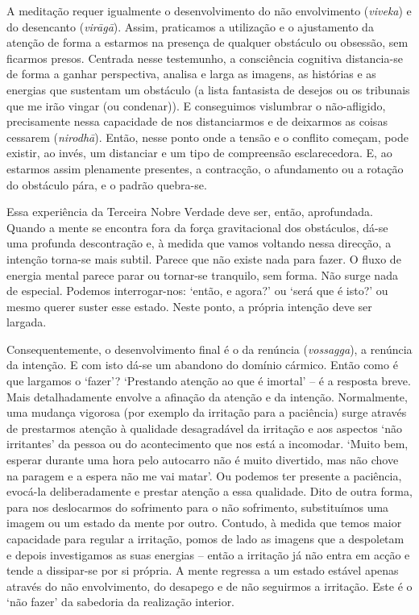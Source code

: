 A meditação requer igualmente o desenvolvimento do não envolvimento (\emph{viveka}) e do desencanto (\emph{virāgā}). Assim, praticamos a utilização e o ajustamento da atenção de forma a estarmos na presença de qualquer obstáculo ou obsessão, sem ficarmos presos. Centrada nesse testemunho, a consciência cognitiva distancia-se de forma a ganhar perspectiva, analisa e larga as imagens, as histórias e as energias que sustentam um obstáculo (a lista fantasista de desejos ou os tribunais que me irão vingar (ou condenar)). E conseguimos vislumbrar o não-afligido, precisamente nessa capacidade de nos distanciarmos e de deixarmos as coisas cessarem (\emph{nirodhā}). Então, nesse ponto onde a tensão e o conflito começam, pode existir, ao invés, um distanciar e um tipo de compreensão esclarecedora. E, ao estarmos assim plenamente presentes, a contracção, o afundamento ou a rotação do obstáculo pára, e o padrão quebra-se.

Essa experiência da Terceira Nobre Verdade deve ser, então, aprofundada. Quando a mente se encontra fora da força gravitacional dos obstáculos, dá-se uma profunda descontração e, à medida que vamos voltando nessa direcção, a intenção torna-se mais subtil. Parece que não existe nada para fazer. O fluxo de energia mental parece parar ou tornar-se tranquilo, sem forma. Não surge nada de especial. Podemos interrogar-nos: `então, e agora?' ou `será que é isto?' ou mesmo querer suster esse estado. Neste ponto, a própria intenção deve ser largada.

Consequentemente, o desenvolvimento final é o da renúncia (\emph{vossagga}), a renúncia da intenção. E com isto dá-se um abandono do domínio cármico. Então como é que largamos o `fazer'? `Prestando atenção ao que é imortal' -- é a resposta breve. Mais detalhadamente envolve a afinação da atenção e da intenção. Normalmente, uma mudança vigorosa (por exemplo da irritação para a paciência) surge através de prestarmos atenção à qualidade desagradável da irritação e aos aspectos `não irritantes' da pessoa ou do acontecimento que nos está a incomodar. `Muito bem, esperar durante uma hora pelo autocarro não é muito divertido, mas não chove na paragem e a espera não me vai matar'. Ou podemos ter presente a paciência, evocá-la deliberadamente e prestar atenção a essa qualidade. Dito de outra forma, para nos deslocarmos do sofrimento para o não sofrimento, substituímos uma imagem ou um estado da mente por outro. Contudo, à medida que temos maior capacidade para regular a irritação, pomos de lado as imagens que a despoletam e depois investigamos as suas energias -- então a irritação já não entra em acção e tende a dissipar-se por si própria. A mente regressa a um estado estável apenas através do não envolvimento, do desapego e de não seguirmos a irritação. Este é o `não fazer' da sabedoria da realização interior.

